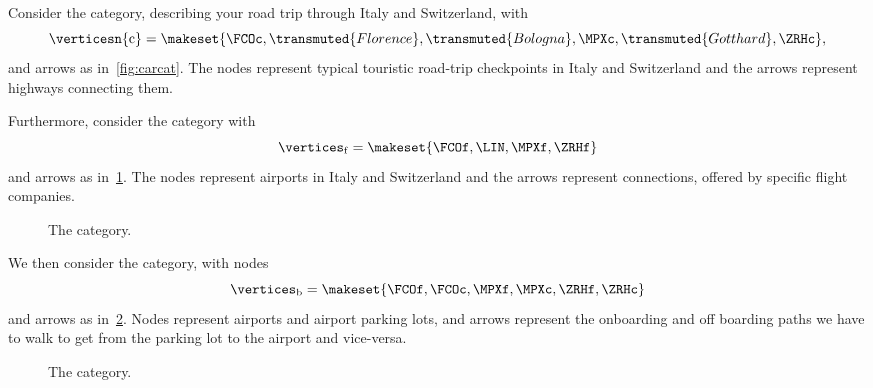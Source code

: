 \begin{example}
    \label{exa:car-category}
    Consider the \Car category, describing your road trip through Italy and Switzerland, with
    \begin{equation}
        \verticesn{\mathrm{c}}=
        \makeset{
            \FCOc,
            \transmuted{Florence},
            \transmuted{Bologna},
            \MPXc,
            \transmuted{Gotthard},
            \ZRHc
        },
    \end{equation}
    and arrows as in~\cref{fig:carcat}.
    The nodes represent typical touristic road-trip checkpoints in Italy and Switzerland and the arrows represent highways connecting them.

    \begin{figure*}[h!]
        \caption{The \Car category.}
        \label{fig:carcat}
    \end{figure*}

    Furthermore, consider the \Flight category with
    \begin{equation}
        \vertices_\mathrm{f}
        = \makeset{
            \FCOf,
            \LIN,
            \MPXf,
            \ZRHf
        }
    \end{equation}
    and arrows as in~\cref{fig:flight}.
    The nodes represent airports in Italy and Switzerland and the arrows represent connections, offered by specific flight companies.

    \begin{figure}[h!]
        \centering
        \caption{The \Flight category.}
        \label{fig:flight}
    \end{figure}

    We then consider the \Board category, with nodes
    \begin{equation}
        \vertices_\mathrm{b}=\makeset{\FCOf,\FCOc,\MPXf,\MPXc,\ZRHf,\ZRHc}
    \end{equation}
    and arrows as in~\cref{fig:boarding}.
    Nodes represent airports and airport parking lots, and arrows represent the onboarding and off boarding paths we have to walk to get from the parking lot to the airport and vice-versa.

    \begin{figure}[h!]
        \centering
        \caption{The \Board category. }
        \label{fig:boarding}
    \end{figure}


\end{example}
